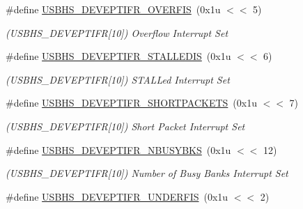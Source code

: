 \begin{DoxyCompactItemize}
\#define \mbox{\hyperlink{group__SAME70__USBHS_ga5f6aa026b3b128a93676d9c9d91d18ef}{U\+S\+B\+H\+S\+\_\+\+D\+E\+V\+E\+P\+T\+I\+F\+R\+\_\+\+O\+V\+E\+R\+F\+IS}}~(0x1u $<$$<$ 5)
\begin{DoxyCompactList}\small\item\em (U\+S\+B\+H\+S\+\_\+\+D\+E\+V\+E\+P\+T\+I\+FR\mbox{[}10\mbox{]}) Overflow Interrupt Set \end{DoxyCompactList}\item 
\mbox{\label{group__SAME70__USBHS_ga846303c6eec66e5d8173a46e59853b49}} 
\#define \mbox{\hyperlink{group__SAME70__USBHS_ga846303c6eec66e5d8173a46e59853b49}{U\+S\+B\+H\+S\+\_\+\+D\+E\+V\+E\+P\+T\+I\+F\+R\+\_\+\+S\+T\+A\+L\+L\+E\+D\+IS}}~(0x1u $<$$<$ 6)
\begin{DoxyCompactList}\small\item\em (U\+S\+B\+H\+S\+\_\+\+D\+E\+V\+E\+P\+T\+I\+FR\mbox{[}10\mbox{]}) S\+T\+A\+L\+Led Interrupt Set \end{DoxyCompactList}\item 
\mbox{\label{group__SAME70__USBHS_ga0296712d52b09beb0817d8f5c62cb452}} 
\#define \mbox{\hyperlink{group__SAME70__USBHS_ga0296712d52b09beb0817d8f5c62cb452}{U\+S\+B\+H\+S\+\_\+\+D\+E\+V\+E\+P\+T\+I\+F\+R\+\_\+\+S\+H\+O\+R\+T\+P\+A\+C\+K\+E\+TS}}~(0x1u $<$$<$ 7)
\begin{DoxyCompactList}\small\item\em (U\+S\+B\+H\+S\+\_\+\+D\+E\+V\+E\+P\+T\+I\+FR\mbox{[}10\mbox{]}) Short Packet Interrupt Set \end{DoxyCompactList}\item 
\mbox{\label{group__SAME70__USBHS_ga75f18604fd51b2f10dd5cc994437ec13}} 
\#define \mbox{\hyperlink{group__SAME70__USBHS_ga75f18604fd51b2f10dd5cc994437ec13}{U\+S\+B\+H\+S\+\_\+\+D\+E\+V\+E\+P\+T\+I\+F\+R\+\_\+\+N\+B\+U\+S\+Y\+B\+KS}}~(0x1u $<$$<$ 12)
\begin{DoxyCompactList}\small\item\em (U\+S\+B\+H\+S\+\_\+\+D\+E\+V\+E\+P\+T\+I\+FR\mbox{[}10\mbox{]}) Number of Busy Banks Interrupt Set \end{DoxyCompactList}\item 
\mbox{\label{group__SAME70__USBHS_ga4ebbb91c6cde6340f9472320d19a88f2}} 
\#define \mbox{\hyperlink{group__SAME70__USBHS_ga4ebbb91c6cde6340f9472320d19a88f2}{U\+S\+B\+H\+S\+\_\+\+D\+E\+V\+E\+P\+T\+I\+F\+R\+\_\+\+U\+N\+D\+E\+R\+F\+IS}}~(0x1u $<$$<$ 2)
$$
\end{DoxyCompactItemize}
